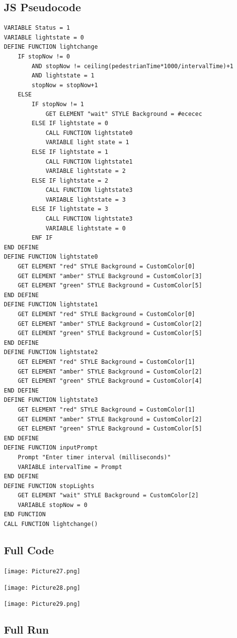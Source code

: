 \documentclass[a4paper]{article}
\begin{document}
\subsection{JS Pseudocode}
\begin{lstlisting}
VARIABLE Status = 1
VARIABLE lightstate = 0
DEFINE FUNCTION lightchange
	IF stopNow != 0 
		AND stopNow != ceiling(pedestrianTime*1000/intervalTime)+1 
		AND lightstate = 1
		stopNow = stopNow+1
	ELSE
		IF stopNow != 1
			GET ELEMENT "wait" STYLE Background = #ececec
		ELSE IF lightstate = 0
			CALL FUNCTION lightstate0
			VARIABLE light state = 1
		ELSE IF lightstate = 1
			CALL FUNCTION lightstate1
			VARIABLE lightstate = 2
		ELSE IF lightstate = 2
			CALL FUNCTION lightstate3
			VARIABLE lightstate = 3
		ELSE IF lightstate = 3
			CALL FUNCTION lightstate3
			VARIABLE lightstate = 0
		ENF IF
END DEFINE
DEFINE FUNCTION lightstate0
	GET ELEMENT "red" STYLE Background = CustomColor[0]
	GET ELEMENT "amber" STYLE Background = CustomColor[3]
	GET ELEMENT "green" STYLE Background = CustomColor[5]
END DEFINE
DEFINE FUNCTION lightstate1
	GET ELEMENT "red" STYLE Background = CustomColor[0]
	GET ELEMENT "amber" STYLE Background = CustomColor[2]
	GET ELEMENT "green" STYLE Background = CustomColor[5]
END DEFINE
DEFINE FUNCTION lightstate2
	GET ELEMENT "red" STYLE Background = CustomColor[1]
	GET ELEMENT "amber" STYLE Background = CustomColor[2]
	GET ELEMENT "green" STYLE Background = CustomColor[4]
END DEFINE
DEFINE FUNCTION lightstate3
	GET ELEMENT "red" STYLE Background = CustomColor[1]
	GET ELEMENT "amber" STYLE Background = CustomColor[2]
	GET ELEMENT "green" STYLE Background = CustomColor[5]
END DEFINE
DEFINE FUNCTION inputPrompt
	Prompt "Enter timer interval (milliseconds)"
	VARIABLE intervalTime = Prompt
END DEFINE
DEFINE FUNCTION stopLights
	GET ELEMENT "wait" STYLE Background = CustomColor[2]
	VARIABLE stopNow = 0
END FUNCTION
CALL FUNCTION lightchange()
\end{lstlisting}
\subsection{Full Code}
\noindent\texttt{[image: Picture27.png]} \par
\noindent\texttt{[image: Picture28.png]} \par
\noindent\texttt{[image: Picture29.png]} \par \newpage
\subsection{Full Run}
\end{document}
